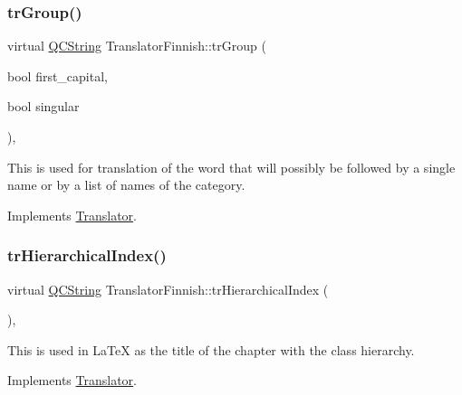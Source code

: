 \mbox{\label{class_translator_finnish_aa1f8914251f790587f2e669cf2b023aa}} 
\subsubsection{\texorpdfstring{trGroup()}{trGroup()}}
{\footnotesize\ttfamily virtual \mbox{\hyperlink{class_q_c_string}{Q\+C\+String}} Translator\+Finnish\+::tr\+Group (\begin{DoxyParamCaption}\item[{bool}]{first\+\_\+capital,  }\item[{bool}]{singular }\end{DoxyParamCaption})\hspace{0.3cm}{\ttfamily [inline]}, {\ttfamily [virtual]}}

This is used for translation of the word that will possibly be followed by a single name or by a list of names of the category. 

Implements \mbox{\hyperlink{class_translator}{Translator}}.

\mbox{\label{class_translator_finnish_ad99803e0cf46b1b4c8445204d51724a6}} 
\subsubsection{\texorpdfstring{trHierarchicalIndex()}{trHierarchicalIndex()}}
{\footnotesize\ttfamily virtual \mbox{\hyperlink{class_q_c_string}{Q\+C\+String}} Translator\+Finnish\+::tr\+Hierarchical\+Index (\begin{DoxyParamCaption}{ }\end{DoxyParamCaption})\hspace{0.3cm}{\ttfamily [inline]}, {\ttfamily [virtual]}}

This is used in La\+TeX as the title of the chapter with the class hierarchy. 

Implements \mbox{\hyperlink{class_translator}{Translator}}.

\mbox{\label{class_translator_finnish_a4f1c8d237487fa45b7f374686ce2e508}} 

